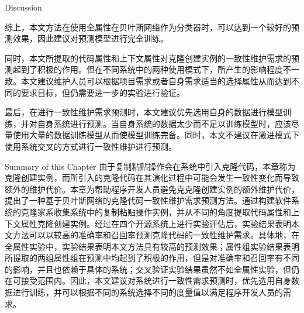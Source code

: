 {Discussion}

综上，本文方法在使用全属性在贝叶斯网络作为分类器时，可以达到一个较好的预测效果，因此建议对预测模型进行完全训练。

同时，本文所提取的代码属性和上下文属性对克隆创建实例的一致性维护需求的预测起到了积极的作用。但在不同系统中的两种使用模式下，所产生的影响程度不一致。本文建议维护人员可以根据项目需求或者自身需求适当的选择属性从而达到不同的要求目标，但仍需要进一步的实验进行验证。

最后，在进行一致性维护需求预测时，本文建议优先选用自身的数据进行模型训练，并对自身系统进行预测。当自身系统的数据太少而不足以训练模型时，应该尽量使用大量的数据训练模型从而使模型训练完备。同时，本文不建议在激进模式下使用系统交叉的方式进行一致性维护进行预测。


{Summary of this Chapter}
由于复制粘贴操作会在系统中引入克隆代码，本章称为克隆创建实例，而所引入的克隆代码在其演化过程中可能会发生一致性变化而导致额外的维护代价。本章为帮助程序开发人员避免克克隆创建实例的额外维护代价，提出了一种基于贝叶斯网络的克隆代码一致性维护需求预测方法。通过构建软件系统的克隆家系收集系统中的复制粘贴操作实例，并从不同的角度提取代码属性和上下文属性克隆创建实例。经过在四个开源系统上进行实验评估后，实验结果表明本文方法可以以较高的准确率和召回率预测克隆代码的一致性维护需求。具体地，在全属性实验中，实验结果表明本文方法具有较高的预测效果；属性组实验结果表明所提取的两组属性组在预测中均起到了积极的作用，但是对准确率和召回率有不同的影响，并且也依赖于具体的系统；交叉验证实验结果虽然不如全属性实验，但仍在可接受范围内。因此，本文建议对系统进行一致性需求预测时，优先选用自身数据进行训练，并可以根据不同的系统选择不同的度量值以满足程序开发人员的需求。

